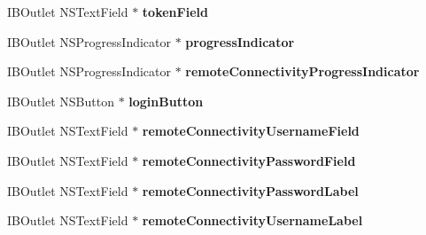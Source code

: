 \begin{DoxyCompactItemize}
\item 
\hypertarget{interface_m_d_main_preferences_view_controller_a7a49586da4593f1a245e506a493bf1c5}{I\-B\-Outlet N\-S\-Text\-Field $\ast$ {\bfseries token\-Field}}\label{interface_m_d_main_preferences_view_controller_a7a49586da4593f1a245e506a493bf1c5}

\item 
\hypertarget{interface_m_d_main_preferences_view_controller_a183c0e47b1347fce6b8aab64d5699fb0}{I\-B\-Outlet N\-S\-Progress\-Indicator $\ast$ {\bfseries progress\-Indicator}}\label{interface_m_d_main_preferences_view_controller_a183c0e47b1347fce6b8aab64d5699fb0}

\item 
\hypertarget{interface_m_d_main_preferences_view_controller_a0f6de749f466faed5411ebac6cd138dd}{I\-B\-Outlet N\-S\-Progress\-Indicator $\ast$ {\bfseries remote\-Connectivity\-Progress\-Indicator}}\label{interface_m_d_main_preferences_view_controller_a0f6de749f466faed5411ebac6cd138dd}

\item 
\hypertarget{interface_m_d_main_preferences_view_controller_af128e0c8bcfd01971e2215c26bb03fc0}{I\-B\-Outlet N\-S\-Button $\ast$ {\bfseries login\-Button}}\label{interface_m_d_main_preferences_view_controller_af128e0c8bcfd01971e2215c26bb03fc0}

\item 
\hypertarget{interface_m_d_main_preferences_view_controller_a0f7f3c03e1d0197706b047ee4e4c3146}{I\-B\-Outlet N\-S\-Text\-Field $\ast$ {\bfseries remote\-Connectivity\-Username\-Field}}\label{interface_m_d_main_preferences_view_controller_a0f7f3c03e1d0197706b047ee4e4c3146}

\item 
\hypertarget{interface_m_d_main_preferences_view_controller_aea7df25cacece630d6984354b2c60df1}{I\-B\-Outlet N\-S\-Text\-Field $\ast$ {\bfseries remote\-Connectivity\-Password\-Field}}\label{interface_m_d_main_preferences_view_controller_aea7df25cacece630d6984354b2c60df1}

\item 
\hypertarget{interface_m_d_main_preferences_view_controller_a80954d05623ba3af06147b28fcd90a7f}{I\-B\-Outlet N\-S\-Text\-Field $\ast$ {\bfseries remote\-Connectivity\-Password\-Label}}\label{interface_m_d_main_preferences_view_controller_a80954d05623ba3af06147b28fcd90a7f}

\item 
\hypertarget{interface_m_d_main_preferences_view_controller_a19a592c32039011a58b9abb787d77648}{I\-B\-Outlet N\-S\-Text\-Field $\ast$ {\bfseries remote\-Connectivity\-Username\-Label}}\label{interface_m_d_main_preferences_view_controller_a19a592c32039011a58b9abb787d77648}


\end{DoxyCompactItemize}
